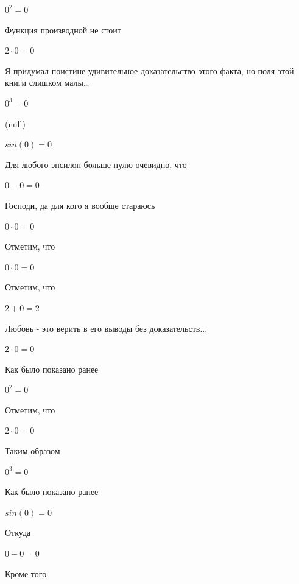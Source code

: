 \documentclass[12pt,a4paper,fleqn]{article}
\begin{document}
\begin{center}$0^{2} = 0$\end{center}
Функция производной не стоит\cite{link2}

\begin{center}$2 \cdot 0 = 0$\end{center}
Я придумал поистине удивительное доказательство этого факта, но поля этой книги слишком малы\ldots

\begin{center}$0^{3} = 0$\end{center}
(null)\cite{link4}

\begin{center}$sin(0) = 0$\end{center}
Для любого эпсилон больше нулю очевидно, что

\begin{center}$0-0 = 0$\end{center}
Господи, да для кого я вообще стараюсь

\begin{center}$0 \cdot 0 = 0$\end{center}
Отметим, что

\begin{center}$0 \cdot 0 = 0$\end{center}
Отметим, что

\begin{center}$2+0 = 2$\end{center}
Любовь - это верить в его выводы без доказательств...

\begin{center}$2 \cdot 0 = 0$\end{center}
Как было показано ранее

\begin{center}$0^{2} = 0$\end{center}
Отметим, что

\begin{center}$2 \cdot 0 = 0$\end{center}
Таким образом

\begin{center}$0^{3} = 0$\end{center}
Как было показано ранее

\begin{center}$sin(0) = 0$\end{center}
Откуда

\begin{center}$0-0 = 0$\end{center}
Кроме того
\end{document}
